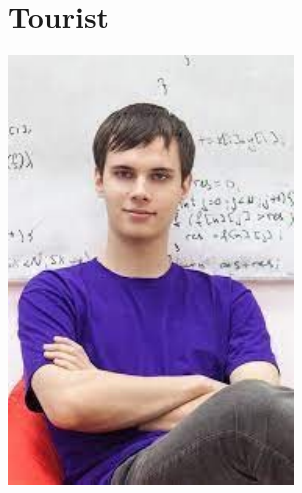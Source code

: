 \section{Tourist}
\begin{minipage}{90mm}
\includegraphics[width=\textwidth]{content/various/tourist}
\end{minipage}
